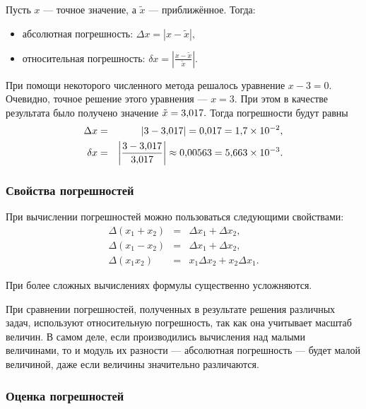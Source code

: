 Пусть $x$ — точное значение, а $\tilde{x}$ — приближённое. Тогда:
\begin{itemize}
\item абсолютная погрешность: $\Delta x=|x-\tilde{x}|,$
\item относительная погрешность: $\delta x=\left|\frac{x-\tilde{x}}{\tilde{x}}\right|.$\end{itemize}
\begin{example}
При помощи некоторого численного метода решалось уравнение $x-3=0.$
Очевидно, точное решение этого уравнения — $x=3.$ При этом в качестве
результата было получено значение $\tilde{x}=3{,}017.$ Тогда погрешности
будут равны
\begin{eqnarray*}
\Delta x & = & |3-3{,}017|=0{,}017=1{,}7\times10^{-2},\\
\delta x & = & \left|\frac{3-3{,}017}{3{,}017}\right|\approx0{,}00563=5{,}663\times10^{-3}.
\end{eqnarray*}

\end{example}
\smallskip{}



\subsubsection{Свойства погрешностей}

При вычислении погрешностей можно пользоваться следующими свойствами:
\begin{eqnarray*}
\Delta(x_{1}+x_{2}) & = & \Delta x_{1}+\Delta x_{2},\\
\Delta(x_{1}-x_{2}) & = & \Delta x_{1}+\Delta x_{2},\\
\Delta(x_{1}x_{2}) & = & x_{1}\Delta x_{2}+x_{2}\Delta x_{1}.
\end{eqnarray*}


При более сложных вычислениях формулы существенно усложняются.

При сравнении погрешностей, полученных в результате решения различных
задач, используют относительную погрешность, так как она учитывает
масштаб величин. В самом деле, если производились вычисления над малыми
величинами, то и модуль их разности — абсолютная погрешность — будет
малой величиной, даже если величины значительно различаются.


\subsubsection{Оценка погрешностей}

